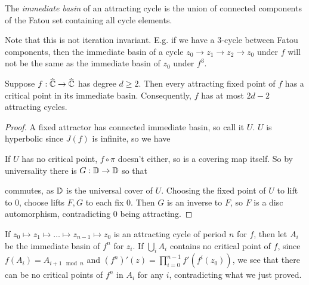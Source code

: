 \documentclass[10pt,a4paper]{article}
\begin{document}
\begin{definition}
  The \emph{immediate basin} of an attracting cycle is the union of connected components of the Fatou set containing all cycle elements.
\end{definition}
Note that this is not iteration invariant. E.g. if we have a 3-cycle between Fatou components, then the immediate basin of a cycle $z_0\to z_1 \to z_2 \to z_0$ under $f$ will not be the same as the immediate basin of $z_0$ under $f^3$.

\begin{theorem}
  Suppose $f: \widehat{\mathbb{C}}\to \widehat{\mathbb{C}}$ has degree $d\geq 2$. Then every attracting fixed point of $f$ has a critical point in its immediate basin. Consequently, $f$ has at most $2d-2$ attracting cycles.
\end{theorem}
\begin{proof}
  A fixed attractor has connected immediate basin, so call it $U$. $U$ is hyperbolic since $J(f)$ is infinite, so we have
  \begin{center}
  \end{center}
  If $U$ has no critical point, $f\circ \pi$ doesn't either, so is a covering map itself. So by universality there is $G:\mathbb{D} \to \mathbb{D}$ so that
  \begin{center}
  \end{center}
  commutes, as $\mathbb{D}$ is the universal cover of $U$. Choosing the fixed point of $U$ to lift to 0, choose lifts $F, G$ to each fix 0. Then $G$ is an inverse to $F$, so $F$ is a disc automorphism, contradicting 0 being attracting.
\end{proof}

If $z_0 \mapsto z_1 \mapsto \ldots \mapsto z_{n-1} \mapsto z_0$ is an attracting cycle of period $n$ for $f$, then let $A_i$ be the immediate basin of $f^n$ for $z_i$. If $\bigcup_i A_i$ contains no critical point of $f$, since $f(A_i) = A_{i+1 \mod n}$ and $(f^n)'(z) = \prod_{i=0}^{n-1}f'(f^i(z_0))$, we see that there can be no critical points of $f^n$ in $A_i$ for any $i$, contradicting what we just proved.
\end{document}
